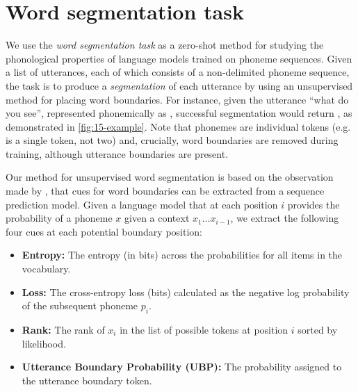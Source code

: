 \section{Word segmentation task}


We use the \emph{word segmentation task} as a zero-shot method for studying the phonological properties of language models trained on phoneme sequences. Given a list of utterances, each of which consists of a non-delimited phoneme sequence, the task is to produce a \emph{segmentation} of each utterance by using an unsupervised method for placing word boundaries. For instance, given the utterance ``what do you see'', represented phonemically as , successful segmentation would return , as demonstrated in \cref{fig:15-example}. Note that phonemes are individual tokens (e.g.  is a single token, not two) and, crucially, word boundaries are removed during training, although utterance boundaries are present.

Our method for unsupervised word segmentation is based on the observation made by \citet{elman-1990-finding}, that cues for word boundaries can be extracted from a sequence prediction model. Given a language model that at each position $i$ provides the probability of a phoneme $x$ given a context $x_1\ldots x_{i-1}$, we extract the following four cues at each potential boundary position:


\begin{itemize}[leftmargin=*]
    \item \textbf{Entropy:} The entropy (in bits) across the probabilities for all items in the vocabulary.%
    \item \textbf{Loss:} The cross-entropy loss (bits) calculated as the negative log probability of the subsequent phoneme $p_i$.
    \item \textbf{Rank:} The rank of $x_i$ in the list of possible tokens at position $i$ sorted by likelihood.
    \item \textbf{Utterance Boundary Probability (UBP):} The probability assigned to the utterance boundary token.
\end{itemize}

